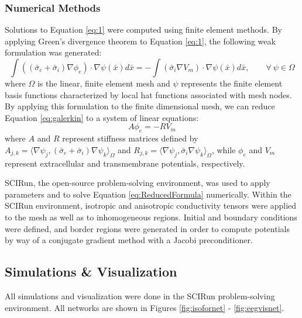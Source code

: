 \subsubsection{Numerical Methods}
\label{sec:numerical}


Solutions to Equation \ref{eq:1} were computed using finite element methods.  By applying 
Green's divergence theorem to Equation \ref{eq:1}, the following weak formulation was generated:
\begin{equation}
\int ((\bar{\sigma}_e + \bar{\sigma}_i)\nabla \phi_e) \cdot \nabla \psi(\bar{x})d\bar{x} = - \int (\bar{\sigma}
_i \nabla V_m)\cdot \nabla \psi(\bar{x})d\bar{x}, \quad \quad \forall \ \psi \in \Omega
\label{eq:galerkin}
\end{equation}
where $\Omega$ is the linear, finite element mesh and $\psi$ represents the finite element basis functions characterized by local hat functions associated with mesh nodes. By applying this formulation to the finite dimensional mesh, we can reduce Equation \ref{eq:galerkin} to a system of linear equations:
\begin{equation}
A \phi_e = -RV_m
\label{eq:ReducedFormula}
\end{equation}
where $A$ and $R$ represent stiffness matrices defined by $A_{j,k} = \langle \nabla \psi_j,(\bar{\sigma}
_e + \bar{\sigma}_i)\nabla \psi_k \rangle_\Omega$ and $R_{j,k} = \langle \nabla \psi_j,\bar{\sigma}_i
\nabla \psi_k \rangle_\Omega$,
while $\phi_e$ and $V_m$ represent extracellular and transmembrane potentials, respectively.\cite{ref:fem}

SCIRun, the open-source problem-solving environment, was used to apply parameters and to solve Equation  \ref{eq:ReducedFormula} numerically.  Within the SCIRun environment, isotropic and anisotropic conductivity tensors were applied to the mesh as well as to inhomogeneous regions. Initial and boundary conditions were defined, and border regions were generated in order to compute potentials by way of a conjugate gradient method with a Jacobi preconditioner.

\subsection{Simulations \& Visualization}
\label{sec:sim}

All simulations and visualization were done in the SCIRun problem-solving environment. All networks are shown in Figures \ref{fig:isofornet} - \ref{fig:eegvisnet}.

